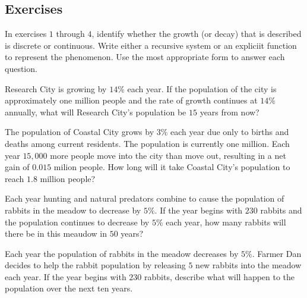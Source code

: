\documentclass[10pt,]{book}
\theoremstyle{ptxdefinitionnotitle}
\theoremstyle{ptxdefinitiontitle}
\theoremstyle{ptxdefinitionnotitle}
\theoremstyle{ptxdefinitiontitle}
\theoremstyle{ptxdefinitionnotitle}
\theoremstyle{ptxdefinitiontitle}
\numberwithin{equation}{section}
\begin{document}
\subsection[{Exercises}]{Exercises}\label{exercises-5}
\hypertarget{exercisegroup-1}{}
\par\noindent \hypertarget{p-124}{}%
In exercises \(1\) through \(4\), identify whether the growth (or decay) that is described is discrete or continuous.  Write either a recursive system or an expliciit function to represent the phenomenon. Use the most appropriate form to answer each question.%
\begin{exercisegroup}{1}
\begin{egexercise}{1}\hypertarget{exercise-20}{}
\hypertarget{p-125}{}%
Research City is growing by \(14\%\) each year.  If the population of the city is approximately one million people and the rate of growth continues at \(14\%\) annually, what will Research City's population be \(15\) years from now?%
\end{egexercise}%
\begin{egexercise}{2}\hypertarget{exercise-21}{}
\hypertarget{p-126}{}%
The population of Coastal City grows by \(3\%\) each year due only to births and deaths among current residents.  The population is currently one million.  Each year \(15,000\) more people move into the city than move out, resulting in a net gain of \(0.015\) milion people. How long will it take Coastal City's population to reach \(1.8\) million people?%
\end{egexercise}%
\begin{egexercise}{3}\hypertarget{exercise-22}{}
\hypertarget{p-127}{}%
Each year hunting and natural predators combine to cause the population of rabbits in the meadow to decrease by \(5\%\).  If the year begins with \(230\) rabbits and the population continues to decrease by \(5\%\) each year, how many rabbits will there be in this meaudow in \(50\) years?%
\end{egexercise}%
\begin{egexercise}{4}\hypertarget{exercise-23}{}
\hypertarget{p-128}{}%
Each year the population of rabbits in the meadow decreases by \(5\%\).  Farmer Dan decides to help the rabbit population by releasing \(5\) new rabbits into the meadow each year.  If the year begins with \(230\) rabbits, describe what will happen to the population over the next ten years.%
\end{egexercise}%
\end{exercisegroup}
\par\noindent%
\end{document}
